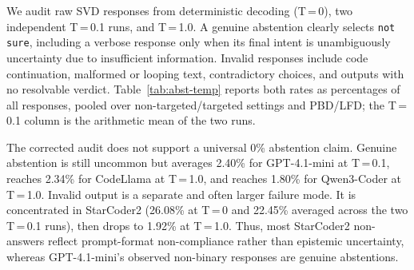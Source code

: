 \documentclass[lettersize,journal]{IEEEtran}
\begin{document}
{%
We audit raw SVD responses from deterministic decoding (T\,=\,0), two independent T\,=\,0.1 runs, and T\,=\,1.0. A genuine abstention clearly selects \texttt{not sure}, including a verbose response only when its final intent is unambiguously uncertainty due to insufficient information. Invalid responses include code continuation, malformed or looping text, contradictory choices, and outputs with no resolvable verdict. Table~\ref{tab:abst-temp} reports both rates as percentages of all responses, pooled over non-targeted/targeted settings and PBD/LFD; the T\,=\,0.1 column is the arithmetic mean of the two runs.

\begin{table}[H]
\centering
\scriptsize
\setlength{\tabcolsep}{3pt}
\renewcommand{\arraystretch}{0.95}
\caption{Genuine abstention and invalid-response rates (\% of all responses), shown as genuine/invalid. Rates are pooled over both SVD settings and both datasets; T\,=\,0.1 is averaged across two runs. GPT-4.1-mini was available only at T\,=\,0.1.}
\label{tab:abst-temp}
\end{table}

The corrected audit does not support a universal 0\% abstention claim. Genuine abstention is still uncommon but averages 2.40\% for GPT-4.1-mini at T\,=\,0.1, reaches 2.34\% for CodeLlama at T\,=\,1.0, and reaches 1.80\% for Qwen3-Coder at T\,=\,1.0. Invalid output is a separate and often larger failure mode. It is concentrated in StarCoder2 (26.08\% at T\,=\,0 and 22.45\% averaged across the two T\,=\,0.1 runs), then drops to 1.92\% at T\,=\,1.0. Thus, most StarCoder2 non-answers reflect prompt-format non-compliance rather than epistemic uncertainty, whereas GPT-4.1-mini's observed non-binary responses are genuine abstentions.
}
\end{document}
